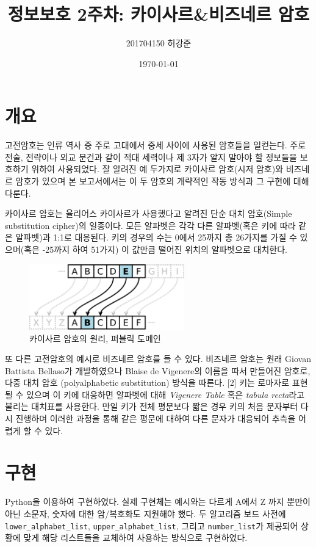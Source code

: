 \documentclass{article}
\title{정보보호 2주차: 카이사르\&비즈네르 암호}
\author{201704150 허강준}
\date{\today}
\begin{document}
    \maketitle
    
    \section{개요}
    고전암호는 인류 역사 중 주로 고대에서 중세 사이에 사용된 암호들을 일컫는다. 주로 전술, 전략이나 외교 문건과 같이 적대 세력이나 제 3자가 알지 말아야 할 정보들을 보호하기
    위하여 사용되었다. 잘 알려진 예 두가지로 카이사르 암호(시저 암호)와 비즈네르 암호가 있으며 본 보고서에서는 이 두 암호의 개략적인 작동 방식과 그 구현에 대해 다룬다.

    카이사르 암호는 율리어스 카이사르가 사용했다고 알려진 단순 대치 암호(Simple substitution cipher)의 일종이다. 모든 알파벳은 각각 다른 알파벳(혹은 키에 따라 같은 알파벳)과 1:1로
    대응된다. 키의 경우의 수는 0에서 25까지 총 26가지를 가질 수 있으며(혹은 -25까지 하여 51가지) 이 값만큼 떨어진 위치의 알파벳으로 대치한다. 
    
    \begin{figure}[!htbp]
        \centering
        \includegraphics[width=0.6\textwidth]{image/caesar.png}
        \caption{카이사르 암호의 원리, 퍼블릭 도메인}
        \label{}
    \end{figure}

    또 다른 고전암호의 예시로 비즈네르 암호를 들 수 있다. 비즈네르 암호는 원래 Giovan Battista Bellaso가 개발하였으나
     Blaise de Vigenere의 이름을 따서 만들어진 암호로, 다중 대치 암호 (polyalphabetic substitution) 방식을 따른다. [2]
    키는 로마자로 표현될 수 있으며 이 키에 대응하면 알파벳에 대해 \textit{Vigenere Table} 혹은 \textit{tabula recta}라고 
    불리는 대치표를 사용한다. 만일 키가 전체 평문보다 짧은 경우 키의 처음 문자부터 다시 진행하며 이러한 과정을 통해 같은 평문에
    대하여 다른 문자가 대응되어 추측을 어렵게 할 수 있다.

    \section{구현}
    Python을 이용하여 구현하였다. 실제 구현체는 예시와는 다르게 A에서 Z 까지 뿐만이 아닌 소문자, 숫자에 대한 암/복호화도 지원해야
    했다. 두 알고리즘 보드 사전에 \texttt{lower\_alphabet\_list}, \texttt{upper\_alphabet\_list}, 그리고 \texttt{number\_list}가
    제공되어 상황에 맞게 해당 리스트들을 교체하여 사용하는 방식으로 구현하였다. 
\end{document}
